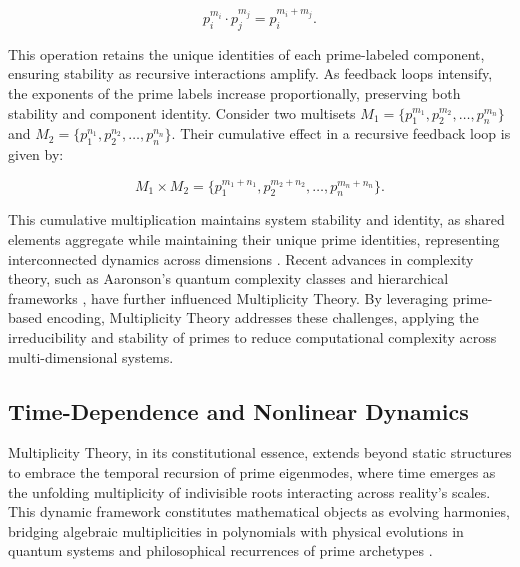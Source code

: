 \documentclass{article}
\theoremstyle{plain}
\begin{document}
\begin{equation}
p_i^{m_i} \cdot p_j^{m_j} = p_i^{m_i + m_j}.
\end{equation}

This operation retains the unique identities of each prime-labeled component, ensuring stability as recursive interactions amplify. As feedback loops intensify, the exponents of the prime labels increase proportionally, preserving both stability and component identity. Consider two multisets \( M_1 = \{p_1^{m_1}, p_2^{m_2}, \ldots, p_n^{m_n}\} \) and \( M_2 = \{p_1^{n_1}, p_2^{n_2}, \ldots, p_n^{n_n}\} \). Their cumulative effect in a recursive feedback loop is given by:

\begin{equation}
M_1 \times M_2 = \{p_1^{m_1 + n_1}, p_2^{m_2 + n_2}, \ldots, p_n^{m_n + n_n}\}.
\end{equation}

This cumulative multiplication maintains system stability and identity, as shared elements aggregate while maintaining their unique prime identities, representing interconnected dynamics across dimensions \citep{blizard1989, kumar1990}. Recent advances in complexity theory, such as Aaronson’s quantum complexity classes and hierarchical frameworks \citep{aaronson2005}, have further influenced Multiplicity Theory. By leveraging prime-based encoding, Multiplicity Theory addresses these challenges, applying the irreducibility and stability of primes to reduce computational complexity across multi-dimensional systems.

\subsection{Time-Dependence and Nonlinear Dynamics}
Multiplicity Theory, in its constitutional essence, extends beyond static structures to embrace the temporal recursion of prime eigenmodes, where time emerges as the unfolding multiplicity of indivisible roots interacting across reality's scales. This dynamic framework constitutes mathematical objects as evolving harmonies, bridging algebraic multiplicities in polynomials with physical evolutions in quantum systems and philosophical recurrences of prime archetypes \citep{Strogatz2015,SakuraiNapolitano2017,ReedSimon1972}.
\end{document}
